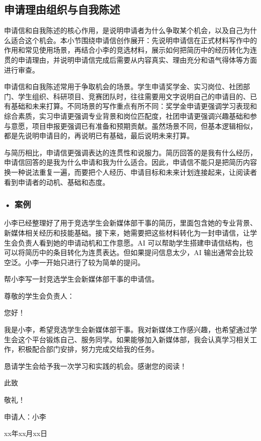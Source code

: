 \subsection{申请理由组织与自我陈述}

申请信和自我陈述的核心作用，是说明申请者为什么争取某个机会，以及自己为什么适合这个机会。本小节围绕申请信创作展开：先说明申请信在正式材料写作中的作用和常见使用场景，再结合小李的竞选材料，展示如何把简历中的经历转化为连贯的申请理由，并说明申请信完成后需要从内容真实、理由充分和语气得体等方面进行审查。

申请信和自我陈述常用于争取机会的场景。学生申请奖学金、实习岗位、社团部门、学生组织、科研项目、竞赛团队时，往往需要用文字说明自己的申请目的、已有基础和未来打算。不同场景的写作重点有所不同：奖学金申请更强调学习表现和综合素质，实习申请更强调专业背景和岗位匹配度，社团申请更强调兴趣基础和参与意愿，项目申报更强调已有准备和预期贡献。虽然场景不同，但基本逻辑相似，都是先说明申请目的，再说明已有基础，最后说明未来打算。

与简历相比，申请信更强调表达的连贯性和说服力。简历回答的是我有什么经历，申请信回答的是我为什么申请和我为什么适合。因此，申请信不能只是把简历内容换一种说法重复一遍，而要把个人经历、申请目标和未来计划连接起来，让阅读者看到申请者的动机、基础和态度。

\subsubsection*{\textbf{• 案例}}

小李已经整理好了用于竞选学生会新媒体部干事的简历，里面包含她的专业背景、新媒体相关经历和技能基础。接下来，她需要把这些材料转化为一封申请信，让学生会负责人看到她的申请动机和工作意愿。AI 可以帮助学生搭建申请信结构，也可以将简历中的条目转化为连贯表达。但如果提问信息太少，AI 输出通常会比较空泛。小李一开始只进行了较为简单的提问。

\begin{userbox}
帮小李写一封竞选学生会新媒体部干事的申请信。
\end{userbox}

\begin{aibox}
\noindent 尊敬的学生会负责人：

\par\qquad 您好！

\par\qquad 我是小李，希望竞选学生会新媒体部干事。我对新媒体工作感兴趣，也希望通过学生会这个平台锻炼自己、服务同学。如果能够加入新媒体部，我会认真学习相关工作，积极配合部门安排，努力完成交给我的任务。

\par\qquad 恳请学生会给予我一次学习和实践的机会。感谢您的阅读！

\par\qquad 此致

\noindent 敬礼！

\par\hfill 申请人：小李

\par\hfill xx年xx月xx日
\end{aibox}

